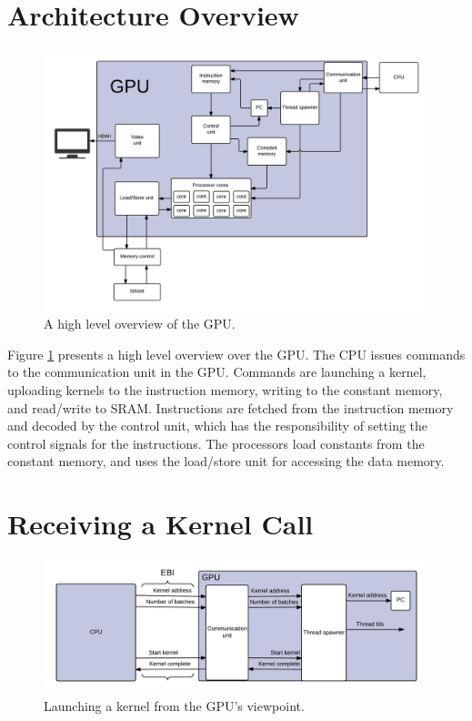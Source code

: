 \documentclass[../main/report.tex]{subfiles}
\begin{document}
\section{Architecture Overview}
\begin{figure}[H]
\centering
\includegraphics[width=\textwidth]{../gpu/diagrams/architecture_overview.png}
\caption{A high level overview of the GPU.}
\label{fig:architecture_overview}
\end{figure}
Figure \ref{fig:architecture_overview} presents a high level overview over the GPU.
The CPU issues commands to the communication unit in the GPU. Commands are launching a kernel, uploading kernels to the instruction memory, writing to the constant memory, and read/write to SRAM.
Instructions are fetched from the instruction memory and decoded by the control unit, which has the responsibility of setting the control signals for the instructions.
The processors load constants from the constant memory, and uses the load/store unit for accessing the data memory.


\section{Receiving a Kernel Call}
\begin{figure}[H]
\centering
\includegraphics[width=\textwidth]{../gpu/diagrams/receiving_a_kernel_call.png}
\caption{Launching a kernel from the GPU's viewpoint.}
\label{fig:kernel_call}
\end{figure}
\end{document}
